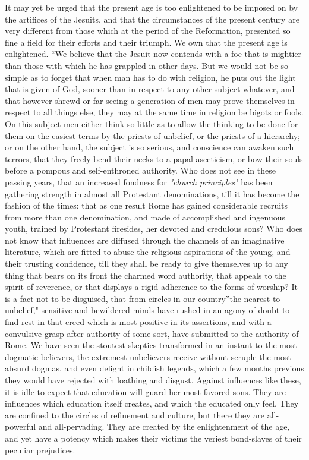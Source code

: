 \documentclass[]{book}
\begin{document}
It may yet be urged that the present age is too enlightened to be imposed on by the artifices of the Jesuits, and that the circumstances of the present century are very different from those which at the period of the Reformation, presented so fine a field for their efforts and their triumph. We own that the present age is enlightened. ``We believe that the Jesuit now contends with a foe that is mightier than those with which he has grappled in other days. But we would not be so simple as to forget that when man has to do with religion, he puts out the light that is given of God, sooner than in respect to any other subject whatever, and that however shrewd or far-seeing a generation of men may prove themselves in respect to all things else, they may at the same time in religion be bigots or fools. On this subject men either think so little as to allow the thinking to be done for them on the easiest terms by the priests of unbelief, or the priests of a hierarchy; or on the other hand, the subject is so serious, and conscience can awaken such terrors, that they freely bend their necks to a papal asceticism, or bow their souls before a pompous and self-enthroned authority. Who does not see in these passing years, that an increased fondness for \emph{"church principles"} has been gathering strength in almost all Protestant denominations, till it has become the fashion of the times: that as one result Rome has gained considerable recruits from more than one denomination, and made of accomplished and ingenuous youth, trained by Protestant firesides, her devoted and credulous sons? Who does not know that influences are diffused through the channels of an imaginative literature, which are fitted to abuse the religious aspirations of the young, and their trusting confidence, till they shall be ready to give themselves up to any thing that bears on its front the charmed word authority, that appeals to the spirit of reverence, or that displays a rigid adherence to the forms of worship? It is a fact not to be disguised, that from circles in our country''the nearest to unbelief," sensitive and bewildered minds have rushed in an agony of doubt to find rest in that creed which is most positive in its assertions, and with a convulsive grasp after authority of some sort, have submitted to the authority of Rome. We have seen the stoutest skeptics transformed in an instant to the most dogmatic believers, the extremest unbelievers receive without scruple the most absurd dogmas, and even delight in childish legends, which a few months previous they would have rejected with loathing and disgust. Against influences like these, it is idle to expect that education will guard her most favored sons. They are influences which education itself creates, and which the educated only feel. They are confined to the circles of refinement and culture, but there they are all-powerful and all-pervading. They are created by the enlightenment of the age, and yet have a potency which makes their victims the veriest bond-slaves of their peculiar prejudices.
\end{document}
